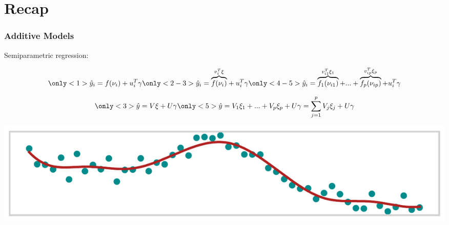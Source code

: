 \documentclass[final]{beamer}
\newcommand{\inserteqstrut}[1]{%
  \rlap{$\displaystyle#1$}%
  \phantom{\biggesteq}}
\begin{document}
\section{Recap}

\renewcommand{\biggesteq}{\overbrace{f(\nu_{i})}^{v^T_{i}\xi_1}}
\begin{frame}[b]
\frametitle{Additive Models}

Semiparametric regression:

\begin{minipage}[b][4em][b]{\textwidth}
\begin{overprint}
\begin{align*}
\only<1>{
\hat{y}_i = \inserteqstrut{f(\nu_{i})} + u^T_i \gamma
}
\only<2-3>{
\hat{y}_i = \inserteqstrut{\overbrace{f(\nu_{i})}^{v^T_{i}\xi}} + u^T_i \gamma
}
\only<4-5>{
\hat{y}_i = \overbrace{f_1(\nu_{i1})}^{v^T_{i1}\xi_1} + ... + \overbrace{f_p(\nu_{ip})}^{v^T_{ip}\xi_p} + u^T_i \gamma
}
\end{align*}
\end{overprint}
\vspace{-2.5em}
\end{minipage}

\begin{minipage}[t][0em][t]{\textwidth}
\vspace{-0.5em}
\end{minipage}

\begin{minipage}[b][4em][b]{\textwidth}
\begin{overprint}
\begin{align*}
\only<3>{
\hat{y} = V\xi + U\gamma
}
\only<5>{
\hat{y} = V_1\xi_1 + ... + V_p \xi_p + U\gamma =\sum_{j=1}^p V_j\xi_j + U\gamma
}
\end{align*}
\end{overprint}
\vspace{-3em}
\end{minipage}


\begin{center}
\includegraphics[width=\textwidth]{Images/flex}
\end{center}

\end{frame}
\end{document}
